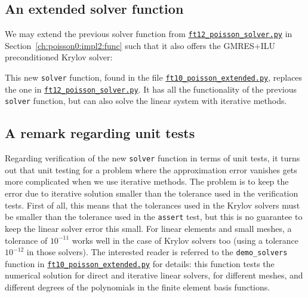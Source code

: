 \documentclass[graybox,envcountchap,sectrefs,final]{svmonodo}
\begin{document}
\subsection{An extended solver function}

We may extend the previous solver function from
\href{{https://fenicsproject.org/pub/tutorial/python/vol1/ft12_poisson_solver.py}}{\nolinkurl{ft12_poisson_solver.py}}
in Section~\ref{ch:poisson0:impl2:func}
such that it also offers the GMRES+ILU
preconditioned Krylov solver:



This new \texttt{solver} function, found in the file
\href{{https://fenicsproject.org/pub/tutorial/python/vol1/ft10_poisson_extended.py}}{\nolinkurl{ft10_poisson_extended.py}},
replaces the one in
\href{{https://fenicsproject.org/pub/tutorial/python/vol1/ft12_poisson_solver.py}}{\nolinkurl{ft12_poisson_solver.py}}.
It has all the functionality of the previous \texttt{solver} function, but
can also solve the linear system with iterative methods.

\subsection{A remark regarding unit tests}

Regarding verification of the new \texttt{solver} function in terms of unit
tests, it turns out that unit testing for a problem where the
approximation error vanishes gets more complicated when we use
iterative methods. The problem is to keep the error due to iterative
solution smaller than the tolerance used in the verification
tests. First of all, this means that the tolerances used in the Krylov
solvers must be smaller than the tolerance used in the \texttt{assert} test,
but this is no guarantee to keep the linear solver error this small.
For linear elements and small meshes, a tolerance of $10^{-11}$ works
well in the case of Krylov solvers too (using a tolerance $10^{-12}$
in those solvers). The interested reader is referred to the
\Verb!demo_solvers! function in
\href{{https://fenicsproject.org/pub/tutorial/python/vol1/ft10_poisson_extended.py}}{\nolinkurl{ft10_poisson_extended.py}}
for details:
this function tests the numerical solution for direct and iterative
linear solvers, for different meshes, and different degrees of the
polynomials in the finite element basis functions.
\end{document}
